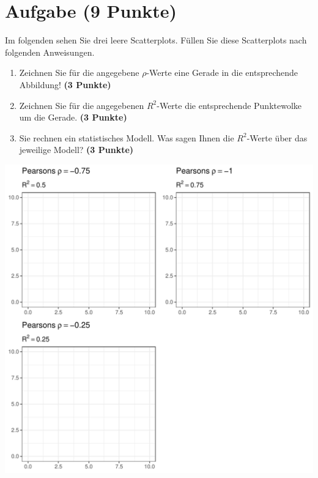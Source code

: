 \documentclass[a4paper, 10pt]{scrartcl}\usepackage[]{graphicx}\usepackage[]{xcolor}
\makeatletter
\def\maxwidth{ %
  \ifdim\Gin@nat@width>\linewidth
    \linewidth
  \else
    \Gin@nat@width
  \fi
}
\makeatother
\begin{document}
\section{Aufgabe \hfill (9 Punkte)}

Im folgenden sehen Sie drei leere Scatterplots. F{\"u}llen Sie diese
Scatterplots nach folgenden Anweisungen.

\begin{enumerate}
\item Zeichnen Sie f{\"u}r die angegebene $\rho$-Werte eine Gerade in die
  entsprechende Abbildung! \textbf{(3 Punkte)}
\item Zeichnen Sie f{\"u}r die angegebenen $R^2$-Werte die entsprechende
  Punktewolke um die Gerade. \textbf{(3 Punkte)}
\item Sie rechnen ein statistisches Modell. Was sagen Ihnen die $R^2$-Werte
  {\"u}ber das jeweilige Modell? \textbf{(3 Punkte)}
\end{enumerate}




{\centering \includegraphics[width=\maxwidth]{img/correlation-01-1} 

}



 
\clearpage
\end{document}
